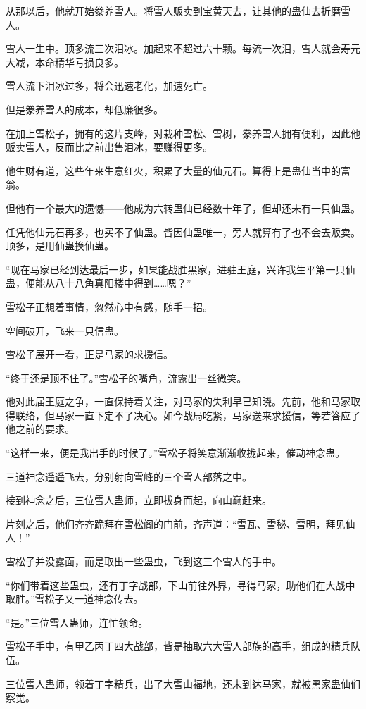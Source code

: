 \begin{this_body}
从那以后，他就开始豢养雪人。将雪人贩卖到宝黄天去，让其他的蛊仙去折磨雪人。

雪人一生中。顶多流三次泪冰。加起来不超过六十颗。每流一次泪，雪人就会寿元大减，本命精华亏损良多。

雪人流下泪冰过多，将会迅速老化，加速死亡。

但是豢养雪人的成本，却低廉很多。

在加上雪松子，拥有的这片支峰，对栽种雪松、雪树，豢养雪人拥有便利，因此他贩卖雪人，反而比之前出售泪冰，要赚得更多。

他生财有道，这些年来生意红火，积累了大量的仙元石。算得上是蛊仙当中的富翁。

但他有一个最大的遗憾——他成为六转蛊仙已经数十年了，但却还未有一只仙蛊。

任凭他仙元石再多，也买不了仙蛊。皆因仙蛊唯一，旁人就算有了也不会去贩卖。顶多，是用仙蛊换仙蛊。

“现在马家已经到达最后一步，如果能战胜黑家，进驻王庭，兴许我生平第一只仙蛊，便能从八十八角真阳楼中得到……嗯？”

雪松子正想着事情，忽然心中有感，随手一招。

空间破开，飞来一只信蛊。

雪松子展开一看，正是马家的求援信。

“终于还是顶不住了。”雪松子的嘴角，流露出一丝微笑。

他对此届王庭之争，一直保持着关注，对马家的失利早已知晓。先前，他和马家取得联络，但马家一直下定不了决心。如今战局吃紧，马家送来求援信，等若答应了他之前的要求。

“这样一来，便是我出手的时候了。”雪松子将笑意渐渐收拢起来，催动神念蛊。

三道神念遥遥飞去，分别射向雪峰的三个雪人部落之中。

接到神念之后，三位雪人蛊师，立即拔身而起，向山巅赶来。

片刻之后，他们齐齐跪拜在雪松阁的门前，齐声道：“雪瓦、雪秘、雪明，拜见仙人！”

雪松子并没露面，而是取出一些蛊虫，飞到这三个雪人的手中。

“你们带着这些蛊虫，还有丁字战部，下山前往外界，寻得马家，助他们在大战中取胜。”雪松子又一道神念传去。

“是。”三位雪人蛊师，连忙领命。

雪松子手中，有甲乙丙丁四大战部，皆是抽取六大雪人部族的高手，组成的精兵队伍。

三位雪人蛊师，领着丁字精兵，出了大雪山福地，还未到达马家，就被黑家蛊仙们察觉。


\end{this_body}
